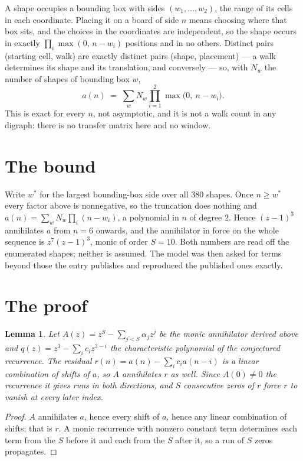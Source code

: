 \documentclass[11pt,a4paper]{article}
\theoremstyle{plain}
\newtheorem{lemma}[theorem]{Lemma}
\theoremstyle{definition}
\begin{document}
A shape occupies a bounding box with sides $(w_1,\dots,w_{2})$, the range of its cells in each
coordinate. Placing it on a board of side $n$ means choosing where that box sits, and the
choices in the coordinates are independent, so the shape occurs in exactly
$\prod_{i}\max(0,\,n-w_i)$ positions and in no others. Distinct pairs (starting cell,
walk) are exactly distinct pairs (shape, placement) --- a walk determines its shape and its
translation, and conversely --- so, with $N_w$ the number of shapes of bounding box $w$,
\[
a(n)\;=\;\sum_{w} N_w \prod_{i=1}^{2}\max\bigl(0,\ n-w_i\bigr).
\]
This is exact for every $n$, not asymptotic, and it is not a walk count in any digraph: there is
no transfer matrix here and no window.

\section{The bound}

Write $w^\ast$ for the largest bounding-box side over all $380$ shapes. Once $n\ge w^\ast$
every factor above is nonnegative, so the truncation does nothing and
$a(n)=\sum_w N_w\prod_i(n-w_i)$, a polynomial in $n$ of degree $2$. Hence $(z-1)^{3}$
annihilates $a$ from $n=6$ onwards, and the annihilator in force on the whole sequence is
$z^{7}(z-1)^{3}$, monic of order $S=10$. Both numbers are read off the enumerated
shapes; neither is assumed. The model was then asked for terms beyond those the entry publishes
and reproduced the published ones exactly.

\section{The proof}

\begin{lemma}\label{lem:crit}
Let $A(z)=z^S-\sum_{j<S}\alpha_jz^{j}$ be the monic annihilator derived above and
$q(z)=z^{3}-\sum_ic_iz^{3-i}$ the characteristic polynomial of the conjectured
recurrence. The residual $r(n)=a(n)-\sum_ic_ia(n-i)$ is a linear combination of shifts of $a$,
so $A$ annihilates $r$ as well. Since $A(0)\ne0$ the recurrence it gives runs in both
directions, and $S$ consecutive zeros of $r$ force $r$ to vanish at every later index.
\end{lemma}

\begin{proof}
$A$ annihilates $a$, hence every shift of $a$, hence any linear combination of shifts; that is
$r$. A monic recurrence with nonzero constant term determines each term from the $S$ before it
and each from the $S$ after it, so a run of $S$ zeros propagates.
\end{proof}
\end{document}
